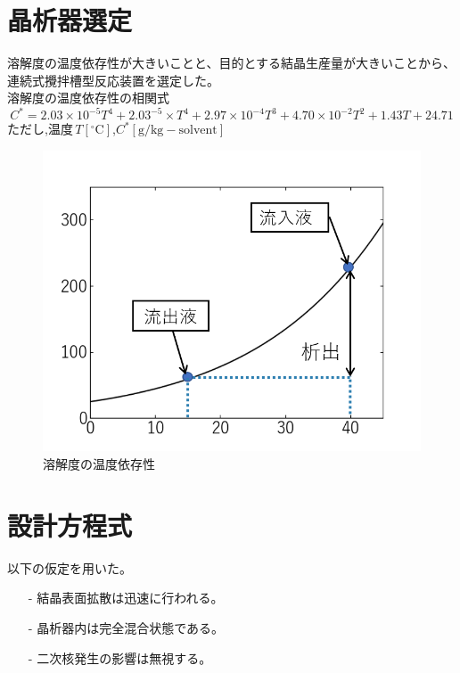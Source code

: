 \documentclass[a4j]{jsreport}
\begin{document}
\section{晶析器選定}
溶解度の温度依存性が大きいことと、目的とする結晶生産量が大きいことから、
連続式攪拌槽型反応装置を選定した。\\
溶解度の温度依存性の相関式
\begin{equation}
    C^*=2.03\times 10^{-5}T^4 +2.03^{-5}\times T^4 + 2.97\times 10^{-4}T^3 + 4.70\times 10^{-2}T^2
        + 1.43T + 24.71
\end{equation}
ただし,温度\,$T[\mathrm{^\circ C}]$,$C^*[\mathrm{g/kg-solvent}]$\\
\begin{figure}[h]
    \begin{center}
        \includegraphics[scale=0.7]{BzAsolvent.png}
        \caption{溶解度の温度依存性}
        \label{溶解度の温度依存性}
    \end{center}
\end{figure}


\section{設計方程式}
以下の仮定を用いた。
\begin{itemize}
    \setlength{\parskip}{0pt}
    \setlength{\itemsep}{2pt} 
    \item[-] 結晶表面拡散は迅速に行われる。
    \item[-] 晶析器内は完全混合状態である。
    \item[-] 二次核発生の影響は無視する。
\end{itemize}
\end{document}
